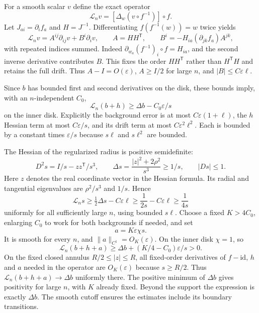 \documentclass[11pt]{article}
\newcommand{\id}{\mathrm{id}}
\begin{document}
For a smooth scalar $v$ define the exact operator
\[
 \mathcal L_n v=[\Delta_w(v\circ f^{-1})]\circ f.
\]
Let $J_{ai}=\partial_i f_a$ and $H=J^{-1}$. Differentiating $f(f^{-1}(w))=w$ twice yields
\begin{equation}\label{eq:operator}
 \mathcal L_n v=A^{ij}\partial_{ij}v+B^i\partial_i v,\qquad
 A=HH^{\mathsf T},\qquad
 B^i=-H_{ia}(\partial_{jk}f_a)A^{jk},
\end{equation}
with repeated indices summed. Indeed $\partial_{w_a}(f^{-1})_i\circ f=H_{ia}$, and the second inverse derivative contributes $B$. This fixes the order $HH^{\mathsf T}$ rather than $H^{\mathsf T}H$ and retains the full drift. Thus $A-I=O(\varepsilon)$, $A\geq I/2$ for large $n$, and $|B|\leq C\varepsilon\ell$.

Since $b$ has bounded first and second derivatives on the disk, these bounds imply, with an $n$-independent $C_0$,
\begin{equation}\label{eq:badbound}
 \mathcal L_n(b+h)\geq\Delta b-C_0\varepsilon/s
\end{equation}
on the inner disk. Explicitly the background error is at most $C\varepsilon(1+\ell)$, the $h$ Hessian term at most $C\varepsilon/s$, and its drift term at most $C\varepsilon^2\ell^2$. Each is bounded by a constant times $\varepsilon/s$ because $s\ell$ and $s\ell^2$ are bounded.

The Hessian of the regularized radius is positive semidefinite:
\[
 D^2s=I/s-zz^{\mathsf T}/s^3,\qquad
 \Delta s=\frac{|z|^2+2\rho^2}{s^3}\geq1/s,\qquad |Ds|\leq1.
\]
Here $z$ denotes the real coordinate vector in the Hessian formula. Its radial and tangential eigenvalues are $\rho^2/s^3$ and $1/s$. Hence
\[
 \mathcal L_n s\geq\tfrac12\Delta s-C\varepsilon\ell
 \geq\frac1{2s}-C\varepsilon\ell\geq\frac1{4s}
\]
uniformly for all sufficiently large $n$, using bounded $s\ell$. Choose a fixed $K>4C_0$, enlarging $C_0$ to work for both backgrounds if needed, and set
\begin{equation}\label{eq:correction}
 a=K\varepsilon\chi s.
\end{equation}
It is smooth for every $n$, and $\|a\|_{C^1}=O_K(\varepsilon)$. On the inner disk $\chi=1$, so
\[
 \mathcal L_n(b+h+a)\geq\Delta b+(K/4-C_0)\varepsilon/s>0.
\]
On the fixed closed annulus $R/2\leq|z|\leq R$, all fixed-order derivatives of $f-\id$, $h$ and $a$ needed in the operator are $O_K(\varepsilon)$ because $s\geq R/2$. Thus $\mathcal L_n(b+h+a)\to\Delta b$ uniformly there. The positive minimum of $\Delta b$ gives positivity for large $n$, with $K$ already fixed. Beyond the support the expression is exactly $\Delta b$. The smooth cutoff ensures the estimates include its boundary transitions.
\end{document}
